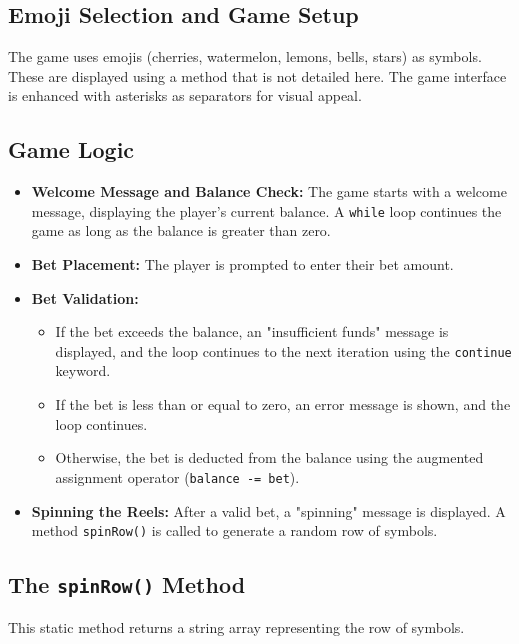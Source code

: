 \documentclass{article}
\begin{document}
\subsection{Emoji Selection and Game Setup}

The game uses emojis (cherries, watermelon, lemons, bells, stars) as symbols.  These are displayed using a method that is not detailed here.  The game interface is enhanced with asterisks as separators for visual appeal.

\subsection{Game Logic}

\begin{itemize}
    \item \textbf{Welcome Message and Balance Check:} The game starts with a welcome message, displaying the player's current balance.  A \texttt{while} loop continues the game as long as the balance is greater than zero.
    \item \textbf{Bet Placement:} The player is prompted to enter their bet amount.
    \item \textbf{Bet Validation:}
    \begin{itemize}
        \item If the bet exceeds the balance, an "insufficient funds" message is displayed, and the loop continues to the next iteration using the \texttt{continue} keyword.
        \item If the bet is less than or equal to zero, an error message is shown, and the loop continues.
        \item Otherwise, the bet is deducted from the balance using the augmented assignment operator (\texttt{balance -= bet}).
    \end{itemize}
    \item \textbf{Spinning the Reels:}  After a valid bet, a "spinning" message is displayed. A method \texttt{spinRow()} is called to generate a random row of symbols.
\end{itemize}


\subsection{The \texttt{spinRow()} Method}

This static method returns a string array representing the row of symbols.
\end{document}
